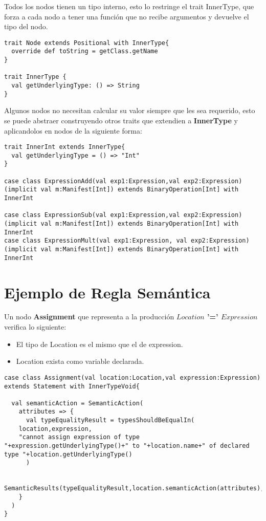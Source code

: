 \documentclass[12pt,letterpaper]{article}
\begin{document}
Todos los nodos tienen un tipo interno, esto lo restringe el trait InnerType, que forza a cada nodo a tener una funci\'{o}n que no recibe argumentos y devuelve el tipo del nodo.

\begin{lstlisting}
trait Node extends Positional with InnerType{
  override def toString = getClass.getName
}

trait InnerType {
  val getUnderlyingType: () => String
}
\end{lstlisting}

Algunos nodos no necesitan calcular su valor siempre que les sea requerido, esto se puede abstraer construyendo otros traits que extendien a \textbf{InnerType} y aplicandolos en nodos de la siguiente forma:

\begin{lstlisting}
trait InnerInt extends InnerType{
  val getUnderlyingType = () => "Int"
}

case class ExpressionAdd(val exp1:Expression,val exp2:Expression)(implicit val m:Manifest[Int]) extends BinaryOperation[Int] with InnerInt

case class ExpressionSub(val exp1:Expression,val exp2:Expression)(implicit val m:Manifest[Int]) extends BinaryOperation[Int] with InnerInt
case class ExpressionMult(val exp1:Expression, val exp2:Expression)(implicit val m:Manifest[Int]) extends BinaryOperation[Int] with InnerInt
\end{lstlisting}

\section*{Ejemplo de Regla Sem\'{a}ntica}

Un nodo \textbf{Assignment} que representa a la producci\'{o}n \textbf{$Location$ '=' $Expression$} verifica lo siguiente:
\begin{itemize}
  \item El tipo de Location es el mismo que el de expression.
  \item Location exista como variable declarada.
\end{itemize}

\begin{lstlisting}
case class Assignment(val location:Location,val expression:Expression) extends Statement with InnerTypeVoid{

  val semanticAction = SemanticAction(
    attributes => {
      val typeEqualityResult = typesShouldBeEqualIn(
	location,expression,
	"cannot assign expression of type "+expression.getUnderlyingType()+" to "+location.name+" of declared type "+location.getUnderlyingType()
      )

      SemanticResults(typeEqualityResult,location.semanticAction(attributes),expression.semanticAction(attributes))
    }
  )
}
\end{lstlisting}
\end{document}
